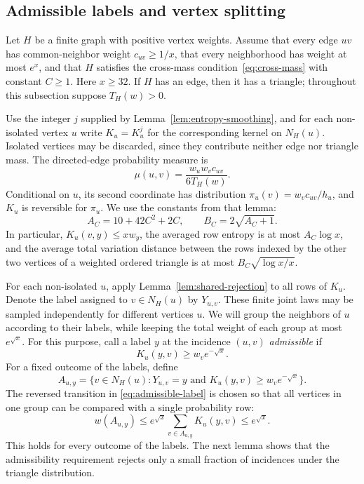 \documentclass[11pt]{article}
\theoremstyle{definition}
\theoremstyle{remark}
\numberwithin{equation}{section}
\begin{document}
\subsection{Admissible labels and vertex splitting}

Let $H$ be a finite graph with positive vertex weights. Assume that every
edge $uv$ has common-neighbor weight $c_{uv}\ge1/x$, that every
neighborhood has weight at most $e^x$, and that $H$ satisfies the
cross-mass condition~\eqref{eq:cross-mass} with constant $C\ge1$. Here $x\ge32$. If $H$ has
an edge, then it has a triangle; throughout this subsection suppose
$T_H(w)>0$.

Use the integer $j$ supplied by Lemma~\ref{lem:entropy-smoothing}, and
for each non-isolated vertex $u$ write $K_u=K_u^j$ for the corresponding
kernel on $N_H(u)$. Isolated vertices may be discarded, since they
contribute neither edge nor triangle mass. The
directed-edge probability measure is
\[
 \mu(u,v)=\frac{w_uw_vc_{uv}}{6T_H(w)}.
\]
Conditional on $u$, its second coordinate has distribution
$\pi_u(v)=w_vc_{uv}/h_u$, and $K_u$ is reversible for $\pi_u$.
We use the constants from that lemma:
\[
 A_C=10+42C^2+2C,
 \qquad B_C=2\sqrt{A_C+1}.
\]
In particular, $K_u(v,y)\le xw_y$, the averaged row entropy is at
most $A_C\log x$, and the average total variation distance between
the rows indexed by the other two vertices of a weighted ordered
triangle is at most $B_C\sqrt{\log x/x}$.

For each non-isolated $u$, apply Lemma~\ref{lem:shared-rejection} to all rows of
$K_u$. Denote the label assigned to $v\in N_H(u)$ by $Y_{u,v}$.
These finite joint laws may be sampled independently for different
vertices $u$.  We will group the neighbors of $u$ according to their
labels, while keeping the total weight of each group at most $e^{\sqrt x}$.
For this purpose, call a label $y$ at the incidence $(u,v)$
\emph{admissible} if
\begin{equation}\label{eq:admissible-label}
 K_u(y,v)\ge w_v e^{-\sqrt x}.
\end{equation}
For a fixed outcome of the labels, define
\[
 A_{u,y}=\{v\in N_H(u):Y_{u,v}=y
       \text{ and }K_u(y,v)\ge w_ve^{-\sqrt x}\}.
\]
The reversed transition in \eqref{eq:admissible-label} is chosen so that
all vertices in one group can be compared with a single probability row:
\begin{equation}\label{eq:label-group-weight}
 w(A_{u,y})
 \le e^{\sqrt x}\sum_{v\in A_{u,y}}K_u(y,v)
 \le e^{\sqrt x}.
\end{equation}
This holds for every outcome of the labels.  The next lemma shows that
the admissibility requirement rejects only a small fraction of incidences
under the triangle distribution.
\end{document}
